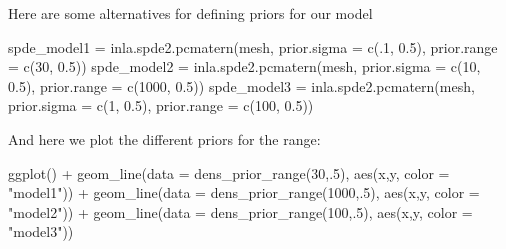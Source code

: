 \documentclass[
  letterpaper,
  DIV=11,
  numbers=noendperiod]{scrartcl}
\newenvironment{Shaded}{\begin{snugshade}}{\end{snugshade}}
\newcommand{\AttributeTok}[1]{\textcolor[rgb]{0.40,0.45,0.13}{#1}}
\newcommand{\DecValTok}[1]{\textcolor[rgb]{0.68,0.00,0.00}{#1}}
\newcommand{\FloatTok}[1]{\textcolor[rgb]{0.68,0.00,0.00}{#1}}
\newcommand{\FunctionTok}[1]{\textcolor[rgb]{0.28,0.35,0.67}{#1}}
\newcommand{\NormalTok}[1]{\textcolor[rgb]{0.00,0.23,0.31}{#1}}
\newcommand{\OtherTok}[1]{\textcolor[rgb]{0.00,0.23,0.31}{#1}}
\newcommand{\SpecialCharTok}[1]{\textcolor[rgb]{0.37,0.37,0.37}{#1}}
\newcommand{\StringTok}[1]{\textcolor[rgb]{0.13,0.47,0.30}{#1}}
\begin{document}
Here are some alternatives for defining priors for our model

\begin{Shaded}
\begin{Highlighting}[]
\NormalTok{spde\_model1 }\OtherTok{=}  \FunctionTok{inla.spde2.pcmatern}\NormalTok{(mesh,}
                                  \AttributeTok{prior.sigma =} \FunctionTok{c}\NormalTok{(.}\DecValTok{1}\NormalTok{, }\FloatTok{0.5}\NormalTok{),}
                                  \AttributeTok{prior.range =} \FunctionTok{c}\NormalTok{(}\DecValTok{30}\NormalTok{, }\FloatTok{0.5}\NormalTok{))}
\NormalTok{spde\_model2 }\OtherTok{=}  \FunctionTok{inla.spde2.pcmatern}\NormalTok{(mesh,}
                                  \AttributeTok{prior.sigma =} \FunctionTok{c}\NormalTok{(}\DecValTok{10}\NormalTok{, }\FloatTok{0.5}\NormalTok{),}
                                  \AttributeTok{prior.range =} \FunctionTok{c}\NormalTok{(}\DecValTok{1000}\NormalTok{, }\FloatTok{0.5}\NormalTok{))}
\NormalTok{spde\_model3 }\OtherTok{=}  \FunctionTok{inla.spde2.pcmatern}\NormalTok{(mesh,}
                                  \AttributeTok{prior.sigma =} \FunctionTok{c}\NormalTok{(}\DecValTok{1}\NormalTok{, }\FloatTok{0.5}\NormalTok{),}
                                  \AttributeTok{prior.range =} \FunctionTok{c}\NormalTok{(}\DecValTok{100}\NormalTok{, }\FloatTok{0.5}\NormalTok{))}
\end{Highlighting}
\end{Shaded}

And here we plot the different priors for the range:

\begin{Shaded}
\begin{Highlighting}[]
\FunctionTok{ggplot}\NormalTok{() }\SpecialCharTok{+} 
  \FunctionTok{geom\_line}\NormalTok{(}\AttributeTok{data =} \FunctionTok{dens\_prior\_range}\NormalTok{(}\DecValTok{30}\NormalTok{,.}\DecValTok{5}\NormalTok{), }\FunctionTok{aes}\NormalTok{(x,y, }\AttributeTok{color =} \StringTok{"model1"}\NormalTok{)) }\SpecialCharTok{+}
  \FunctionTok{geom\_line}\NormalTok{(}\AttributeTok{data =} \FunctionTok{dens\_prior\_range}\NormalTok{(}\DecValTok{1000}\NormalTok{,.}\DecValTok{5}\NormalTok{), }\FunctionTok{aes}\NormalTok{(x,y, }\AttributeTok{color =} \StringTok{"model2"}\NormalTok{)) }\SpecialCharTok{+}
  \FunctionTok{geom\_line}\NormalTok{(}\AttributeTok{data =} \FunctionTok{dens\_prior\_range}\NormalTok{(}\DecValTok{100}\NormalTok{,.}\DecValTok{5}\NormalTok{), }\FunctionTok{aes}\NormalTok{(x,y, }\AttributeTok{color =} \StringTok{"model3"}\NormalTok{)) }
\end{Highlighting}
\end{Shaded}
\end{document}
